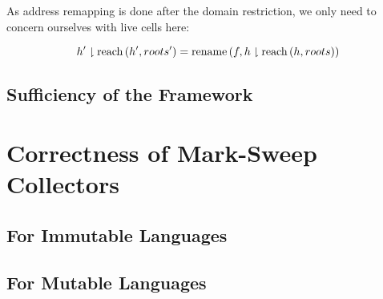 \begin{lemma}
  As address remapping is done after the domain restriction, we only
  need to concern ourselves with live cells here:

  \[h' \downharpoonright \mathrm{reach}\left(h', roots'\right) = \mathrm{rename}\left(f, h \downharpoonright \mathrm{reach}\left(h, roots\right)\right)\]
\end{lemma}

\subsection{Sufficiency of the Framework}


\section{Correctness of Mark-Sweep Collectors}


\subsection{For Immutable Languages}


\subsection{For Mutable Languages}

